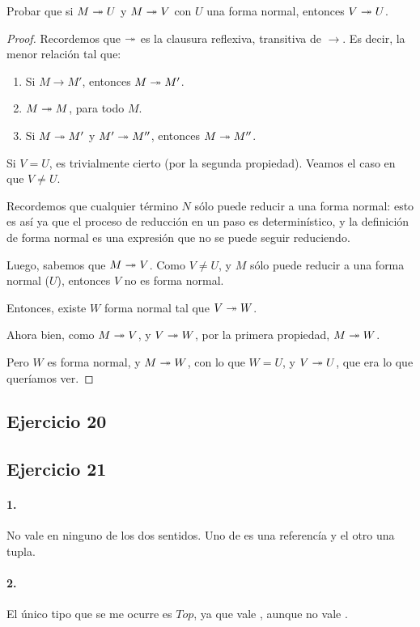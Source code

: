 Probar que si $M \twoheadrightarrow U$ y $M \twoheadrightarrow V$ con $U$ una forma normal, entonces $V \twoheadrightarrow U$.

\begin{proof}
  Recordemos que $\twoheadrightarrow$ es la clausura reflexiva, transitiva de $\to$. Es decir, la menor relación tal que:
  \begin{enumerate}
    \item Si $M\to M'$, entonces $M\twoheadrightarrow M'$.
    \item $M\twoheadrightarrow M$, para todo $M$.
    \item Si $M \twoheadrightarrow M'$ y $M' \twoheadrightarrow M''$, entonces $M \twoheadrightarrow M''$.
  \end{enumerate}

  Si $V = U$, es trivialmente cierto (por la segunda propiedad). Veamos el caso en que $V \neq U$.

  Recordemos que cualquier término $N$ sólo puede reducir a una forma normal: esto es así ya que el proceso de reducción en un paso es determinístico, y la definición de forma normal es una expresión que no se puede seguir reduciendo.

  Luego, sabemos que $M \twoheadrightarrow V$. Como $V \neq U$, y $M$ sólo puede reducir a una forma normal ($U$), entonces $V$ no es forma normal.

  Entonces, existe $W$ forma normal tal que $V \twoheadrightarrow W$.

  Ahora bien, como $M \twoheadrightarrow V$, y $V \twoheadrightarrow W$, por la primera propiedad, $M \twoheadrightarrow W$.

  Pero $W$ es forma normal, y $M \twoheadrightarrow W$, con lo que $W = U$, y $V \twoheadrightarrow U$, que era lo que queríamos ver.
\end{proof}

\subsection*{Ejercicio 20}


\subsection*{Ejercicio 21}

\paragraph{1.} No vale en ninguno de los dos sentidos. Uno de es una referencía y el otro una tupla.

\paragraph{2.} El único tipo que se me ocurre es $Top$, ya que vale , aunque no vale .

